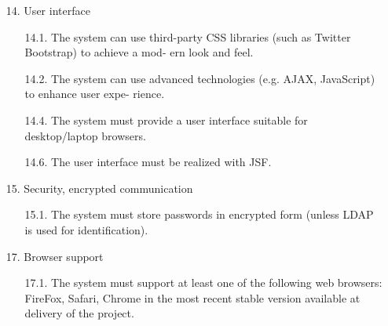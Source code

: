 \begin{enumerate}

\item[14.] User interface

	\begin{enumerate}
	\item[14.1.] The system can use third-party CSS libraries (such as Twitter Bootstrap) to achieve a mod-
	ern look and feel. %
	\item[14.2.] The system can use advanced technologies (e.g. AJAX, JavaScript) to enhance user expe-
	rience. %
	\item[14.4.] The system must provide a user interface suitable for desktop/laptop browsers. %
	\item[14.6.] The user interface must be realized with JSF. %
	\end{enumerate}

\item[15.] Security, encrypted communication

	\begin{enumerate}
	\item[15.1.] The system must store passwords in encrypted form (unless LDAP is used for
	identification). %
	\end{enumerate}

%
%	
%	


\item[17.] Browser support

	\begin{enumerate}
	\item[17.1.] The system must support at least one of the following web browsers: FireFox, Safari,
	Chrome in the most recent stable version available at delivery of the project. %
	\end{enumerate}

\end{enumerate}




